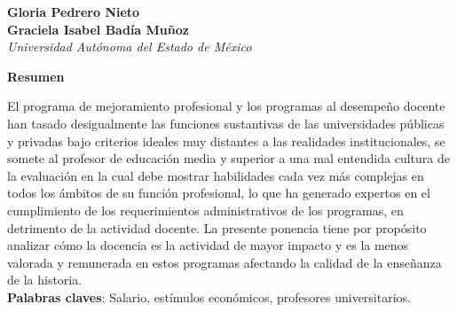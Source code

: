 %

\thispagestyle{empty}
{\par}
\setcounter{footnote}{0}

\bigskip
\begin{center}
{\bfseries Gloria Pedrero Nieto\\
Graciela Isabel Badía Muñoz}\\
{\itshape Universidad Autónoma del Estado de México}
\end{center}

\bigskip
\textbf{Resumen}


\bigskip
El programa de mejoramiento profesional y los programas al desempeño docente
 han tasado desigualmente las funciones sustantivas de las universidades
públicas y privadas bajo criterios ideales  muy distantes a las realidades
institucionales, se somete al profesor de educación media y superior a una
mal entendida cultura de la evaluación  en la cual debe mostrar habilidades
cada vez más complejas en todos los ámbitos de su función profesional, lo
que ha  generado expertos en el cumplimiento de los requerimientos
administrativos de los programas, en detrimento de la actividad docente. La
presente ponencia tiene por propósito analizar cómo la docencia es la
actividad de mayor impacto y es la menos valorada y remunerada en estos
programas afectando la calidad de la enseñanza de la historia.\\
{\bfseries Palabras claves}: Salario, estímulos económicos, profesores
universitarios.


